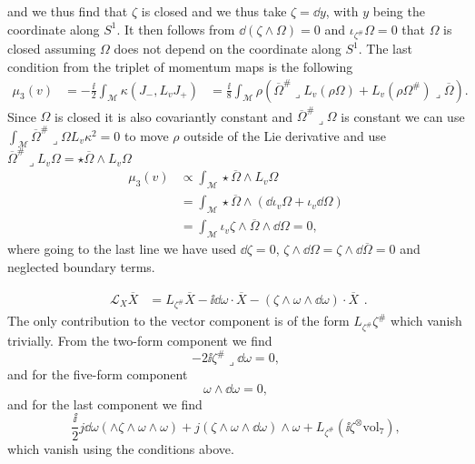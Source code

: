 and we thus find that $\zeta$ is closed and we thus take $\zeta=\dd y$, with $y$ being the coordinate along $S^1$. It then follows from $\dd(\zeta\wedge\Omega)=0$ and $\iota_{\zeta^{\#}}\Omega=0$ that $\Omega$ is closed assuming $\Omega$ does not depend on the coordinate along $S^1$. The last condition from the triplet of momentum maps is the following 
\begin{equation}
    \begin{aligned}
    \mu_3(v) &= -\frac{\ii}{2}\int_\mathcal{M}\kappa(J_-,L_vJ_+)
             &= \frac{\ii}{8}\int_\mathcal{M}\rho \left(\overbar{\Omega}^{\#}\lrcorner L_v(\rho \Omega)+L_v(\rho\Omega^{\#})\lrcorner \overbar{\Omega}\right).
    \end{aligned}
\end{equation}
Since $\Omega$ is closed it is also covariantly constant and $\overbar{\Omega}^{\#}\lrcorner \Omega$ is constant we can use $\int_\mathcal{M}\overbar{\Omega}^{\#}\lrcorner \Omega L_v\kappa^2=0$ to move $\rho$ outside of the Lie derivative and use $\overbar{\Omega}^{\#}\lrcorner L_v \Omega=\star\overbar{\Omega}\wedge L_v \Omega$  
\begin{equation}
    \begin{aligned}
    \mu_3(v) &\propto \int_\mathcal{M}\star\overbar{\Omega}\wedge L_v\Omega \\
            &= \int_\mathcal{M}\star\overbar{\Omega}\wedge (\dd\iota_v\Omega+\iota_v\dd \Omega)\\
            &= \int_{\mathcal{M}} \iota_v\zeta \wedge\overbar{\Omega}\wedge\dd\Omega =0,
    \end{aligned}
\end{equation}
where going to the last line we have used $\dd\zeta=0$, $\zeta\wedge\dd\Omega=\zeta\wedge\dd\overbar{\Omega}=0$ and neglected boundary terms. 


\begin{equation}
    \begin{aligned}
    \mathscr{L}_X\overbar{X} &= L_{\zeta^{\#}}\overbar{X}-\ii\dd\omega\cdot \overbar{X}-(\zeta\wedge\omega\wedge\dd\omega)\cdot \overbar{X}
    \end{aligned}.
\end{equation}
The only contribution to the vector component is of the form $L_{\zeta^{\#}}\zeta^{\#}$ which vanish trivially. From the two-form component we find 
\begin{equation}
    -2\ii\zeta^{\#}\lrcorner\dd\omega = 0,
\end{equation}
and for the five-form component 
\begin{equation}
    \omega\wedge\dd\omega = 0,
\end{equation}
and for the last component we find 
\begin{equation}
    \frac{\ii}{2}j\dd\omega(\wedge\zeta\wedge\omega\wedge\omega)+j(\zeta\wedge\omega\wedge\dd\omega)\wedge\omega+L_{\zeta^{\#}}(\ii\zeta^\otimes\text{vol}_7), 
\end{equation}
which vanish using the conditions above.

